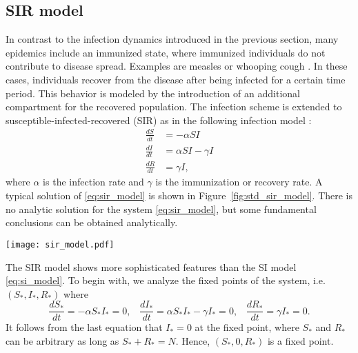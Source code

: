 \subsection{SIR model}\label{sec:sir_model}
In contrast to the infection dynamics introduced in the previous section, many epidemics include an immunized state, where immunized individuals do not contribute to disease spread.
Examples are measles or whooping cough \citep{andersonmay:92,grenfell:92}.
In these cases, individuals recover from the disease after being infected for a certain time period.
This behavior is modeled by the introduction of an additional compartment for the recovered population.
The infection scheme is extended to susceptible-infected-recovered (SIR) as in the following infection model \citep{kermack:27}:
\begin{align}\label{eq:sir_model}
\frac{dS}{dt} &= -\alpha SI \nonumber \\
\frac{dI}{dt} &= \alpha SI -\gamma I \nonumber \\
\frac{dR}{dt} &= \gamma I ,
\end{align}
where $\alpha $ is the infection rate and $\gamma $ is the immunization or recovery rate.
A typical solution of \eqref{eq:sir_model} is shown in Figure~\ref{fig:std_sir_model}.
There is no analytic solution for the system \eqref{eq:sir_model}, but some fundamental conclusions can be obtained analytically.

%
\begin{SCfigure}%
\texttt{[image: sir\_model.pdf]}
\caption{Solution of the susceptible-infected-recovered (SIR) model \eqref{eq:sir_model}.
The number of infected shows that the spreading process is a single event.
Note that a fraction of the population is still susceptible at the end of the process.
Parameters: $\alpha = 3$, $\gamma = 1$, $N=300$, $S_0=1$.}
\label{fig:std_sir_model}
\end{SCfigure}
%

The SIR model shows more sophisticated features than the SI model \eqref{eq:si_model}.
To begin with, we analyze the fixed points of the system, i.e. $(S_*,I_*,R_*)$ where
\begin{equation}
\frac{dS_*}{dt} = -\alpha S_*I_* =0 ,\; \;\;
\frac{dI_*}{dt} = \alpha S_*I_* -\gamma I_* =0,\; \;\;
\frac{dR_*}{dt} = \gamma I_* = 0.
\end{equation}
It follows from the last equation that $I_*=0$ at the fixed point, where $S_*$ and $R_*$ can be arbitrary as long as $S_*+R_*=N$.
Hence, $(S_*,0,R_*)$ is a fixed point.

